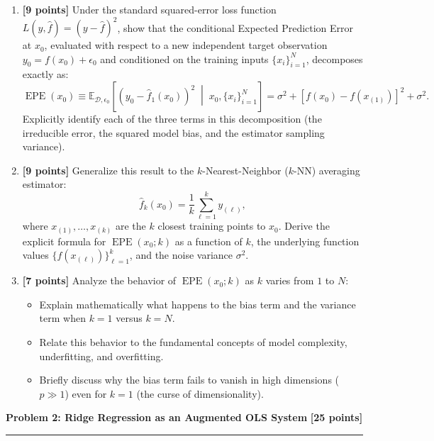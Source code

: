 \documentclass[11pt,a4paper]{article}
\newcommand{\problemheader}[2]{%
  \noindent
  \begin{minipage}{\textwidth}
    {\large\bfseries\textcolor{utblue}{#1}}\hfill
    {\large\bfseries\textcolor{utblue}{#2}}\\[3pt]
    \textcolor{utblue}{\rule{\textwidth}{1pt}}
  \end{minipage}%
  \par\vspace{8pt}
}
\begin{document}
\begin{enumerate}[label=(\alph*), itemsep=5pt, leftmargin=18pt]
  \item \textbf{[9 points]} Under the standard squared-error loss function $L(y, \hat{f}) = (y - \hat{f})^2$, show that the conditional Expected Prediction Error at $x_0$, evaluated with respect to a new independent target observation $y_0 = f(x_0) + \epsilon_0$ and conditioned on the training inputs $\{x_i\}_{i=1}^N$, decomposes exactly as:
  \[
    \operatorname{EPE}(x_0) \equiv \mathbb{E}_{\mathcal{D}, \epsilon_0} \left[ (y_0 - \hat{f}_1(x_0))^2 \;\middle|\; x_0, \{x_i\}_{i=1}^N \right] = \sigma^2 + \left[ f(x_0) - f(x_{(1)}) \right]^2 + \sigma^2.
  \]
  Explicitly identify each of the three terms in this decomposition (the irreducible error, the squared model bias, and the estimator sampling variance).

  \item \textbf{[9 points]} Generalize this result to the $k$-Nearest-Neighbor ($k$-NN) averaging estimator:
  \[
    \hat{f}_k(x_0) = \frac{1}{k} \sum_{\ell=1}^k y_{(\ell)},
  \]
  where $x_{(1)}, \dots, x_{(k)}$ are the $k$ closest training points to $x_0$. Derive the explicit formula for $\operatorname{EPE}(x_0; k)$ as a function of $k$, the underlying function values $\{f(x_{(\ell)})\}_{\ell=1}^k$, and the noise variance $\sigma^2$.

  \item \textbf{[7 points]} Analyze the behavior of $\operatorname{EPE}(x_0; k)$ as $k$ varies from $1$ to $N$:
  \begin{itemize}[itemsep=2pt, leftmargin=14pt]
    \item Explain mathematically what happens to the bias term and the variance term when $k = 1$ versus $k = N$.
    \item Relate this behavior to the fundamental concepts of model complexity, underfitting, and overfitting.
    \item Briefly discuss why the bias term fails to vanish in high dimensions ($p \gg 1$) even for $k=1$ (the curse of dimensionality).
  \end{itemize}
\end{enumerate}

\newpage

\problemheader{Problem 2: Ridge Regression as an Augmented OLS System}{[25 points]}
\end{document}
